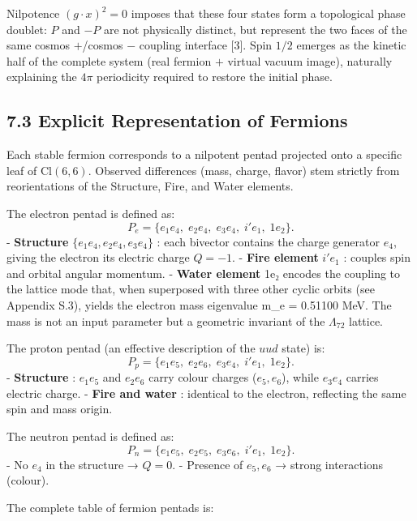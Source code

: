 \documentclass[11pt]{article}
\begin{document}
Nilpotence \((g \cdot x)^2 = 0\) imposes that these four states form a
topological phase doublet: \(P\) and \(-P\) are not physically distinct,
but represent the two faces of the same cosmos \(+\)/cosmos \(-\)
coupling interface {[}3{]}. Spin \(1/2\) emerges as the kinetic half of
the complete system (real fermion \(+\) virtual vacuum image), naturally
explaining the \(4\pi\) periodicity required to restore the initial
phase.

\hypertarget{explicit-representation-of-fermions}{%
\subsection{7.3 Explicit Representation of
Fermions}\label{explicit-representation-of-fermions}}

Each stable fermion corresponds to a nilpotent pentad projected onto a
specific leaf of \(\text{Cl}(6,6)\). Observed differences (mass, charge,
flavor) stem strictly from reorientations of the Structure, Fire, and
Water elements.

The electron pentad is defined as: \[
P_e = \{ e_1e_4,\; e_2e_4,\; e_3e_4,\; i'e_1,\; 1e_2 \}.
\] - \textbf{Structure} \(\{e_1e_4, e_2e_4, e_3e_4\}\) : each bivector
contains the charge generator \(e_4\), giving the electron its electric
charge \(Q=-1\). - \textbf{Fire element} \(i'e_1\) : couples spin and
orbital angular momentum. - \textbf{Water element} 1e₂ encodes the
coupling to the lattice mode that, when superposed with three other
cyclic orbits (see Appendix S.3), yields the electron mass eigenvalue
m\_e = 0.51100 MeV. The mass is not an input parameter but a geometric
invariant of the \(\Lambda_{72}\) lattice.

The proton pentad (an effective description of the \(uud\) state) is: \[
P_p = \{ e_1e_5,\; e_2e_6,\; e_3e_4,\; i'e_1,\; 1e_2 \}.
\] - \textbf{Structure} : \(e_1e_5\) and \(e_2e_6\) carry colour charges
(\(e_5,e_6\)), while \(e_3e_4\) carries electric charge. - \textbf{Fire
and water} : identical to the electron, reflecting the same spin and
mass origin.

The neutron pentad is defined as: \[
P_n = \{ e_1e_5,\; e_2e_5,\; e_3e_6,\; i'e_1,\; 1e_2 \}.
\] - No \(e_4\) in the structure → \(Q=0\). - Presence of \(e_5,e_6\) →
strong interactions (colour).

The complete table of fermion pentads is:
\end{document}
